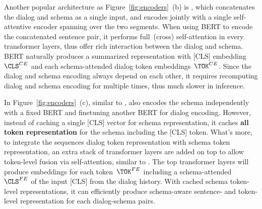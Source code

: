  Another popular architecture as
Figure~\ref{fig:encoders}~(b) is \CE, which concatenates the dialog
and schema as a single input, and encodes jointly with a single
self-attentive encoder spanning over the two segments.  When using
BERT to encode the concatenated sentence pair, it performs
full~(cross) self-attention in every transformer layers, thus offer
rich interaction between the dialog and schema. BERT naturally
produces a summarized representation with [CLS]
embedding~${\CLS^{CE}}$ and each schema-attended dialog token
embeddings~${\TOK^{CE}}$. Since the dialog and schema encoding always
depend on each other, it requires recomputing dialog and schema
encoding for multiple times, thus much slower in inference.
%

 In Figure~\ref{fig:encoders}~(c), similar
to \DE, \FE also encodes the schema independently with a fixed BERT
and finetuning another BERT for dialog encoding. However, instead of
caching a single [CLS] vector for schema representation, it caches {\bf all
token representation} for the schema including the [CLS] token. What's
more, to integrate the sequences dialog token representation with
schema token representation, an extra stack of transformer layers are
added on top to allow token-level fusion via self-attention, similar
to \CE. The top transformer layers will produce embeddings for each
token~${\TOK^{FE}}$ including a schema-attended
~${\CLS^{FE}}$ of the input [CLS] from the dialog
history. With cached schema token-level representations, it can
efficiently produce schema-aware sentence- and token-level
representation for each dialog-schema pairs.

